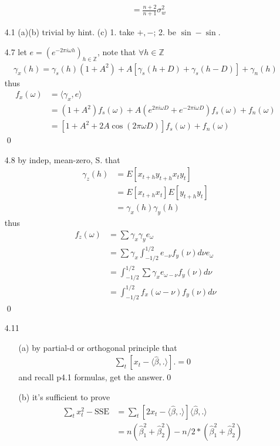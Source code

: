 \documentclass[paper=a4, fontsize=11pt]{scrartcl} %
\numberwithin{equation}{section} %
\numberwithin{figure}{section} %
\numberwithin{table}{section} %
\begin{document}
\begin{itemize}
\begin{align}
			&= \frac{n+2}{n+1}\sigma_w^2
	\end{align}
	\item[4.1](a)(b) trivial by hint. (c) 1. take $+,-$; 2. be $\sin -\sin$.
	\item[4.7] let $e = (e^{-2\pi i\omega h})_{h\in \mathbb{Z}}$, note that $\forall h\in \mathbb{Z}$
	\begin{align}
		\gamma_x(h) = \gamma_s(h)(1+A^2)+A[\gamma_s(h+D)+\gamma_s(h-D)] + \gamma_n(h)
	\end{align}
	thus
	\begin{align}
		f_x(\omega) &= \langle \gamma_x,e\rangle \\
			&= (1+A^2)f_s(\omega) + A(e^{2\pi i \omega D}+e^{-2\pi i \omega D})f_s(\omega) + f_n(\omega)\\
			&= [1+A^2+2A\cos(2\pi \omega D)]f_s(\omega)+ f_n(\omega)
	\end{align}\qed
	\item[4.8] by indep, mean-zero, S. that
	\begin{align}
		\gamma_z(h) &= E[x_{t+h}y_{t+h}x_t y_t] \\
			&= E[x_{t+h}x_t]E[y_{t+h}y_t]\\
			&= \gamma_x(h)\gamma_y(h)
	\end{align}
	thus
	\begin{align}
		f_z(\omega) &= \sum \gamma_x \gamma_y e_\omega\\
			&= \sum \gamma_x \int_{-1/2}^{1/2}e_{-\nu} f_y(\nu)d\nu  e_\omega\\
			&= \int_{-1/2}^{1/2}\sum \gamma_x e_{\omega-\nu} f_y(\nu)d\nu\\
			&= \int_{-1/2}^{1/2}f_x(\omega-\nu)f_y(\nu)d\nu
	\end{align}\qed
	\item[4.11]
	\begin{itemize}
		\item[(a)] by partial-d or orthogonal principle that
		\begin{align}
			\sum_t [x_t - \langle \widehat{\beta}, .\rangle].=0
		\end{align}
		and recall p4.1 formulas, get the answer.\qed
		\item[(b)] it's sufficient to prove
		\begin{align}
			\sum_t x_t^2 - \text{SSE} &= \sum_t [2x_t -\langle \widehat{\beta}, .\rangle] \langle \widehat{\beta}, .\rangle\\
				&= n(\widehat{\beta}_1^2 + \widehat{\beta}_2^2)- n/2 * (\widehat{\beta}_1^2 + \widehat{\beta}_2^2)\\

\end{align}
\end{itemize}
\end{itemize}
\end{document}
